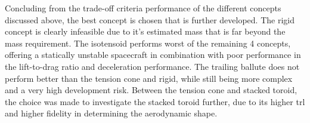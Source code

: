 Concluding from the trade-off criteria performance of the different concepts discussed above, the best concept is chosen that is further developed. The rigid concept is clearly infeasible due to it's estimated mass that is far beyond the mass requirement. The isotensoid performs worst of the remaining 4 concepts, offering a statically unstable spacecraft in combination with poor performance in the lift-to-drag ratio and deceleration performance. The trailing ballute does not perform better than the tension cone and rigid, while still being more complex and a very high development risk. Between the tension cone and stacked toroid, the choice was made to investigate the stacked toroid further, due to its higher \gls{trl} and higher fidelity in determining the aerodynamic shape.